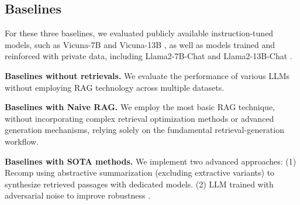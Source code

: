 \subsection{Baselines}

For these three baselines, we evaluated publicly available instruction-tuned models, such as Vicuna-7B and Vicuna-13B \cite{zhengJudgingLLMasaJudgeMTBench2023} , as well as models trained and reinforced with private data, including Llama2-7B-Chat and Llama2-13B-Chat \cite{touvronLlama2Open2023}. 

\textbf{Baselines without retrievals. }We evaluate the performance of various LLMs without employing RAG technology across multiple datasets.

\textbf{Baselines with Naive RAG.} We employ the most basic RAG technique, without incorporating complex retrieval optimization methods or advanced generation mechanisms, relying solely on the fundamental retrieval-generation workflow.

\textbf{Baselines with SOTA methods.} We implement two advanced approaches: (1) Recomp \cite{xu2024recomp}  using abstractive summarization (excluding extractive variants) to synthesize retrieved passages with dedicated models. (2) LLM trained with adversarial noise to improve robustness \cite{yoran2024making}. 








